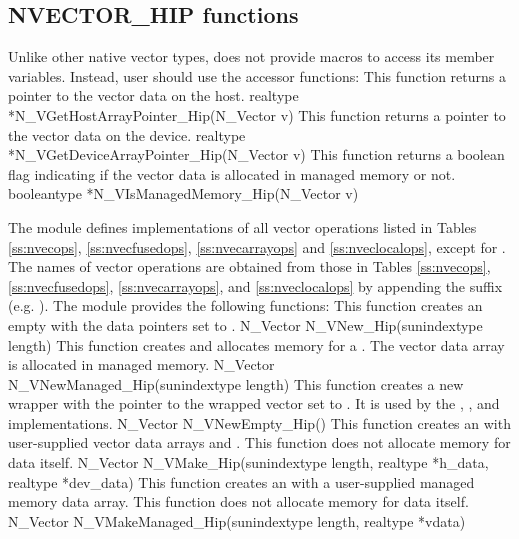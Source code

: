 \subsection{NVECTOR\_HIP functions}
\label{ss:nvec_hip_functions}

Unlike other native {\sundials} vector types, {\nvechip} does not provide macros
to access its member variables. Instead, user should use the accessor functions:
{
  This function returns a pointer to the vector data on the host.
}
{
  realtype *N\_VGetHostArrayPointer\_Hip(N\_Vector v)
}
{
  This function returns a pointer to the vector data on the device.
}
{
  realtype *N\_VGetDeviceArrayPointer\_Hip(N\_Vector v)
}
{
  This function returns a boolean flag indicating if the vector
  data is allocated in managed memory or not.
}
{
  booleantype *N\_VIsManagedMemory\_Hip(N\_Vector v)
}

The {\nvechip} module defines implementations of all vector operations listed
in Tables \ref{ss:nvecops}, \ref{ss:nvecfusedops}, \ref{ss:nvecarrayops}
and \ref{ss:nveclocalops}, except for .
The names of vector operations are obtained from those in Tables \ref{ss:nvecops},
\ref{ss:nvecfusedops}, \ref{ss:nvecarrayops}, and \ref{ss:nveclocalops}
by appending the suffix 
(e.g. ). The module {\nvechip} provides the following
functions:
{
  This function creates an empty {\hip}  with the data
  pointers set to .
}
{
  N\_Vector N\_VNew\_Hip(sunindextype length)
}
{
  This function creates and allocates memory for a {\hip} .
  The vector data array is allocated in managed memory.
}
{
  N\_Vector N\_VNewManaged\_Hip(sunindextype length)
}
{
  This function creates a new {\nvector} wrapper with the pointer to
  the wrapped {\hip} vector set to . It is used by the
  , , and 
  implementations.
}
{
  N\_Vector N\_VNewEmpty\_Hip()
}
{
  This function creates an {\nvechip} with user-supplied vector data arrays
   and . This function does not allocate memory for
  data itself.
}
{
  N\_Vector N\_VMake\_Hip(sunindextype length, realtype *h\_data, realtype *dev\_data)
}
{
  This function creates an {\nvechip} with a user-supplied managed memory data
  array. This function does not allocate memory for data itself.
}
{
  N\_Vector N\_VMakeManaged\_Hip(sunindextype length, realtype *vdata)
}

